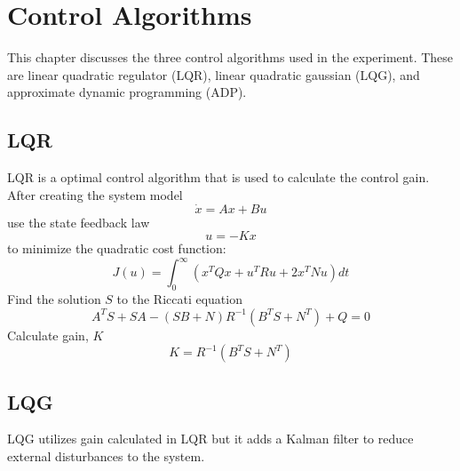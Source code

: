 \chapter{Control Algorithms}
\label{ch: Chapter3}
This chapter discusses the three control algorithms used in the experiment.  These are linear quadratic regulator (LQR), linear quadratic gaussian (LQG), and approximate dynamic programming (ADP).
\section{LQR}
LQR is a optimal control algorithm that is used to calculate the control gain.\\%
    After creating the system model
    \begin{equation}
        \dot{x} = Ax + Bu
    \end{equation}
    use the state feedback law
    \begin{equation}
        u = -Kx
    \end{equation}
    to minimize the quadratic cost function:
    \begin{equation}
        J(u) = \int_0^\infty (x^TQx + u^TRu + 2x^TNu)dt
    \end{equation}
    Find the solution $S$ to the Riccati equation
    \begin{equation}
        A^TS+SA-(SB+N)R^{-1}(B^TS+N^T)+Q=0
    \end{equation}    
    Calculate gain, $K$
    \begin{equation}
        K=R^{-1}(B^TS+N^T)
    \end{equation}

\section{LQG}
LQG utilizes gain calculated in LQR but it adds a Kalman filter to reduce external disturbances to the system.


